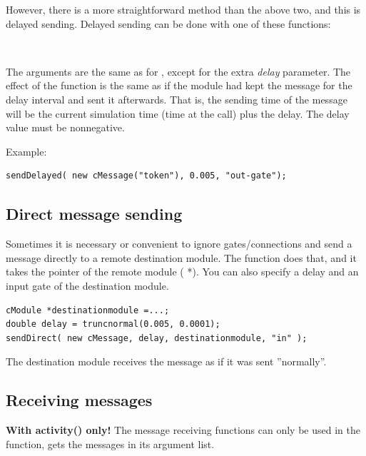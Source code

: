 However, there is a more straightforward method than the above two,
and this is delayed sending. Delayed sending
can be done with one of these functions:

\\


The arguments are the same as for , except for the extra \textit{delay} 
parameter. The effect of the function is the same as if the module 
had kept the message for the delay interval and sent it afterwards. 
That is, the sending time of the message will be the current 
simulation time (time at the  call) plus the delay. 
The delay value must be nonnegative.

Example:

\begin{Verbatim}
sendDelayed( new cMessage("token"), 0.005, "out-gate");
\end{Verbatim}






\subsection{Direct message sending}

Sometimes it is necessary or convenient to ignore gates/connections 
and send a message directly to a remote destination module. The  
function does that, and it takes the pointer of the remote module 
( *). You can also specify a delay and an input gate of 
the destination module.

\begin{Verbatim}
cModule *destinationmodule =...;
double delay = truncnormal(0.005, 0.0001);
sendDirect( new cMessage, delay, destinationmodule, "in" );
\end{Verbatim}

The destination module receives the message as if it was sent 
''normally''.



\subsection{Receiving messages}

\textbf{With activity() only!} The message receiving functions can
only be used in the  function,
 gets the messages in its argument list.

